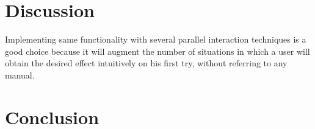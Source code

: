 \chapter{Discussion}

Implementing same functionality with several parallel interaction techniques is a good choice because it will augment the number of situations in which a user will obtain the desired effect intuitively on his first try, without referring to any manual.

\chapter{Conclusion}
